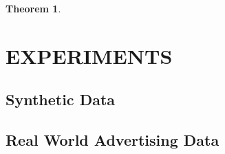 \documentclass[twoside]{article}
\newtheorem{theorem}{Theorem}
\newtheorem{lemma}{Lemma}
\newcommand{\Wave}{{\mathcal{\hat W}^{ave}}}
\newcommand{\w}{\theta}
\newcommand{\wmle}{\hat\w^{mle}}
\newcommand{\wstar}{{\w^{*}}}
\newcommand{\ltwo}[1]{{\left\lVert {#1} \right\rVert}}
\newcommand{\proj}[1]{\pi_{{#1}}}
\newcommand{\ignore}[1]{}
\begin{document}
{\begin{theorem}

\end{theorem}

\ignore{
\subsection{Overall growth}

In this section we assume the following regularity conditions.

\begin{theorem}
Assume conditions (1-5) above hold.
Then in the limit as $n$ approaches $\infty$:
\begin{enumerate}
\item
If $f$ is locally $\sigma$-strongly convex around $\wstar$
\begin{equation}
\Pr{a}
\end{equation}
\item
If $f$ is locally $\ell$-Lipschitz around $\wstar$
(i.e. ),
then
\begin{equation}
\end{equation}
\end{enumerate}
\end{theorem}

\begin{lemma}
\label{lem:normaff}
Let $W : \mathbb{R}^{d\times m}$ be a random matrix where each entry is distributed as a standard Gaussian.
Let $\Wave$ be the affine hull of the columns of $W$;
that is,
\begin{equation}
\Wave = \left\{\sum_{i=1}^m c_i\wmle_i : c\in\mathbb{R}, \sum_{i=1}^m c_i = 1 \right\}
\end{equation}
Then for all $t$,
\begin{equation}
\Pr\left[\ltwo{\proj{W}0}^2 > O(t(1-m/d))\right] \le 1 - \exp(-t)
\end{equation}
\end{lemma}
}
}

\section{EXPERIMENTS}
\label{sec:exp}

\subsection{Synthetic Data}

\subsection{Real World Advertising Data}
\end{document}
